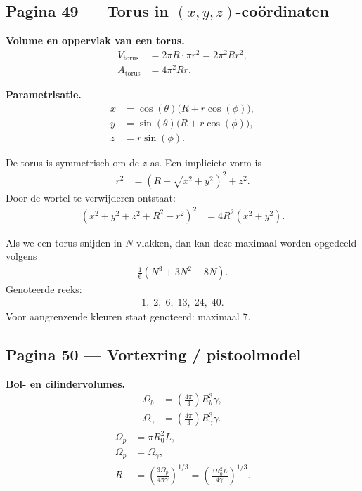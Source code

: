 \documentclass[11pt]{article}
\begin{document}
\subsection*{Pagina 49 --- Torus in $(x,y,z)$-coördinaten}

\textbf{Volume en oppervlak van een torus.}
\begin{align*}
V_{\mathrm{torus}}
  &= 2\pi R \cdot \pi r^2
   = 2\pi^2 R r^2,\\
A_{\mathrm{torus}}
  &= 4\pi^2 R r.
\end{align*}

\textbf{Parametrisatie.}
\begin{align*}
x &= \cos(\theta)\bigl(R+r\cos(\phi)\bigr),\\
y &= \sin(\theta)\bigl(R+r\cos(\phi)\bigr),\\
z &= r\sin(\phi).
\end{align*}

De torus is symmetrisch om de $z$-as. Een impliciete vorm is
\begin{align*}
r^2
  &=\left(R-\sqrt{x^2+y^2}\right)^2+z^2.
\end{align*}
Door de wortel te verwijderen ontstaat:
\begin{align*}
\left(x^2+y^2+z^2+R^2-r^2\right)^2
  &=4R^2\left(x^2+y^2\right).
\end{align*}

Als we een torus snijden in $N$ vlakken, dan kan deze maximaal worden opgedeeld volgens
\begin{align*}
\frac{1}{6}\left(N^3+3N^2+8N\right).
\end{align*}
Genoteerde reeks:
\begin{align*}
1,\;2,\;6,\;13,\;24,\;40.
\end{align*}
Voor aangrenzende kleuren staat genoteerd: maximaal $7$.

\subsection*{Pagina 50 --- Vortexring / pistoolmodel}

\textbf{Bol- en cilindervolumes.}
\begin{align*}
\Omega_b &= \left(\frac{4\pi}{3}\right)R_b^3\gamma,\\
\Omega_\gamma &= \left(\frac{4\pi}{3}\right)R_\gamma^3\gamma.
\end{align*}
\begin{align*}
\Omega_p&=\pi R_0^2L,\\
\Omega_p&=\Omega_\gamma,\\
R
&=
\left(\frac{3\Omega_p}{4\pi\gamma}\right)^{1/3}
=
\left(\frac{3R_0^2L}{4\gamma}\right)^{1/3}.
\end{align*}
\end{document}
